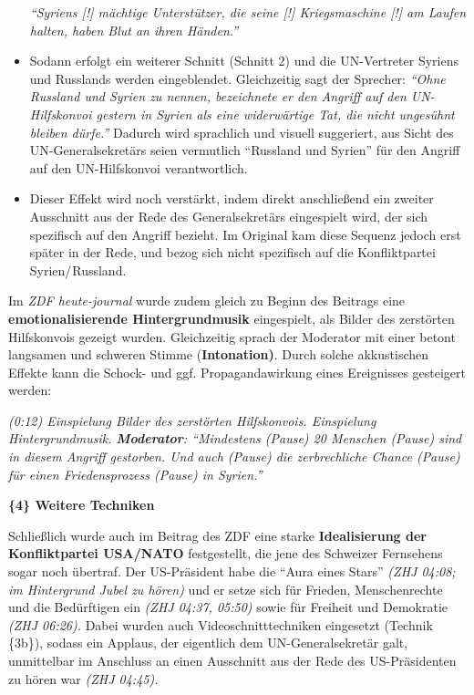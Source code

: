 \begin{itemize}
  \emph{``Syriens {[}!{]} mächtige Unterstützer, die seine {[}!{]}
  Kriegsmaschine {[}!{]} am Laufen halten, haben Blut an ihren
  Händen.''}
\item
  Sodann erfolgt ein weiterer Schnitt (Schnitt 2) und die UN-Vertreter
  Syriens und Russlands werden eingeblendet. Gleichzeitig sagt der
  Sprecher: \emph{``Ohne Russland und Syrien zu nennen, bezeichnete er
  den Angriff auf den UN-Hilfskonvoi gestern in Syrien als eine
  widerwärtige Tat, die nicht ungesühnt bleiben dürfe.''} Dadurch wird
  sprachlich und visuell suggeriert, aus Sicht des UN-General­sekretärs
  seien vermutlich ``Russland und Syrien'' für den Angriff auf den
  UN-Hilfskonvoi verantwortlich.
\item
  Dieser Effekt wird noch verstärkt, indem direkt anschließend ein
  zweiter Ausschnitt aus der Rede des Generalsekretärs eingespielt wird,
  der sich spezifisch auf den Angriff bezieht. Im Original kam diese
  Sequenz jedoch erst später in der Rede, und bezog sich nicht
  spezifisch auf die Konfliktpartei Syrien/ Russland.
\end{itemize}

Im \emph{ZDF heute-journal} wurde zudem gleich zu Beginn des Beitrags
eine \textbf{emotionali­sierende Hinter­grund­musik} eingespielt, als
Bilder des zerstörten Hilfskonvois gezeigt wurden. Gleich­zeitig sprach
der Moderator mit einer betont langsamen und schweren Stimme
(\textbf{Intonation)}. Durch solche akkustischen Effekte kann die
Schock- und ggf. Propagandawirkung eines Ereignisses gesteigert werden:

\emph{(0:12) Einspielung Bilder des zerstörten Hilfskonvois. Einspielung
Hintergrundmusik. \textbf{Moderator}: ``Mindestens (Pause) 20 Menschen
(Pause) sind in diesem Angriff gestorben. Und auch (Pause) die
zerbrechliche Chance (Pause) für einen Friedensprozess (Pause) in
Syrien.''}

\textbf{\{4\} Weitere Techniken}

Schließlich wurde auch im Beitrag des ZDF eine starke
\textbf{Idealisierung der Konfliktpartei USA/NATO} festgestellt, die
jene des Schweizer Fernsehens sogar noch übertraf. Der US-Präsident habe
die ``Aura eines Stars'' \emph{(ZHJ 04:08; im Hintergrund Jubel zu
hören)} und er setze sich für Frieden, Menschenrechte und die
Bedürftigen ein \emph{(ZHJ 04:37, 05:50)} sowie für Freiheit und
Demokratie \emph{(ZHJ 06:26).} Dabei wurden auch Videoschnitt­techniken
eingesetzt (Technik \{3b\}), sodass ein Applaus, der eigentlich dem
UN-Generalsekretär galt, unmittelbar im Anschluss an einen Ausschnitt
aus der Rede des US-Präsidenten zu hören war \emph{(ZHJ 04:45).}

